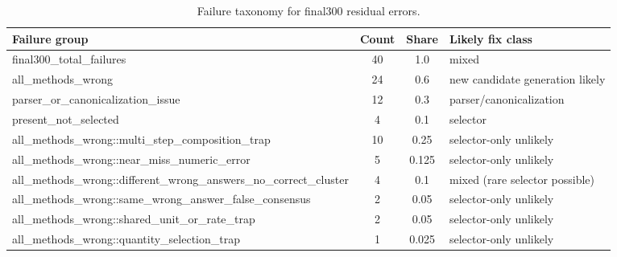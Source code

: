 \begin{table}[t]
\centering
\caption{Failure taxonomy for final300 residual errors.}
\label{tab:failure_taxonomy}
\scriptsize
\begin{tabular}{p{}ccp{}}
\toprule
Failure group & Count & Share & Likely fix class \\
\midrule
final300\_total\_failures & 40 & 1.0 & mixed \\
all\_methods\_wrong & 24 & 0.6 & new candidate generation likely \\
parser\_or\_canonicalization\_issue & 12 & 0.3 & parser/canonicalization \\
present\_not\_selected & 4 & 0.1 & selector \\
all\_methods\_wrong::multi\_step\_composition\_trap & 10 & 0.25 & selector-only unlikely \\
all\_methods\_wrong::near\_miss\_numeric\_error & 5 & 0.125 & selector-only unlikely \\
all\_methods\_wrong::different\_wrong\_answers\_no\_correct\_cluster & 4 & 0.1 & mixed (rare selector possible) \\
all\_methods\_wrong::same\_wrong\_answer\_false\_consensus & 2 & 0.05 & selector-only unlikely \\
all\_methods\_wrong::shared\_unit\_or\_rate\_trap & 2 & 0.05 & selector-only unlikely \\
all\_methods\_wrong::quantity\_selection\_trap & 1 & 0.025 & selector-only unlikely \\
\bottomrule
\end{tabular}
\end{table}
